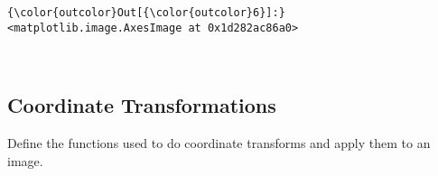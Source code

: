 \documentclass[11pt]{article}
\begin{document}
\begin{Verbatim}[commandchars=\\\{\}]
{\color{outcolor}Out[{\color{outcolor}6}]:} <matplotlib.image.AxesImage at 0x1d282ac86a0>
\end{Verbatim}
            
    \begin{center}
    \end{center}
    { \hspace*{\fill} \\}
    
    \subsection{Coordinate
Transformations}\label{coordinate-transformations}

Define the functions used to do coordinate transforms and apply them to
an image.
\end{document}
